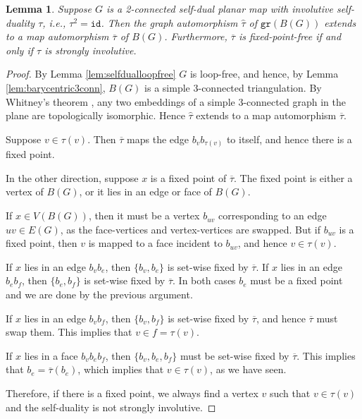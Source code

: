 \documentclass[10pt,a4paper]{article}
\newtheorem{lemma}[theorem]{Lemma}
\newcommand{\gr}{\mathtt{gr}}
\newcommand{\id}{\mathtt{id}}
\begin{document}
\begin{lemma}\label{lem:sisdotherdef}
    Suppose $G$ is a 2-connected self-dual planar map with involutive self-duality $\tau$, i.e., $\tau^2=\id$. Then the graph automorphism $\widehat{\tau}$ of $\gr(B(G))$ extends to a map automorphism $\overline{\tau}$ of $B(G)$. Furthermore, $\overline{\tau}$ is fixed-point-free if and only if $\tau$ is strongly involutive.
\end{lemma}
\begin{proof}
    By Lemma \ref{lem:selfdualloopfree} $G$ is loop-free, and hence, by Lemma \ref{lem:barycentric3conn}, $B(G)$ is a simple  3-connected triangulation. By Whitney's theorem \cite{whitney19332}, any two embeddings of a simple $3$-connected graph in the plane are topologically isomorphic. Hence $\widehat{\tau}$ extends to a map automorphism $\overline{\tau}$.
    
    Suppose $v\in \tau(v)$. Then $\overline{\tau}$ maps the edge $b_vb_{\tau(v)}$ to itself, and hence there is a fixed point. 

    In the other direction, suppose $x$ is a fixed point of $\overline{\tau}$. The fixed point is either a vertex of $B(G)$, or it lies in an edge or face of $B(G)$.
    
    If $x\in V(B(G))$, then it must be a vertex $b_{uv}$ corresponding to an edge $uv\in E(G)$, as the face-vertices and vertex-vertices are swapped. But if $b_{uv}$ is a fixed point, then $v$ is mapped to a face incident to $b_{uv}$, and hence $v\in \tau(v)$.

    If $x$ lies in an edge $b_vb_e$, then $\{b_v,b_e\}$ is set-wise fixed by $\overline{\tau}$. If $x$ lies in an edge $b_eb_f$, then $\{b_e,b_f\}$ is set-wise fixed by $\overline{\tau}$. In both cases $b_e$ must be a fixed point and we are done by the previous argument. 

    If $x$ lies in an edge $b_vb_f$, then $\{b_v,b_f\}$ is set-wise fixed by $\overline{\tau}$, and hence  $\overline{\tau}$ must swap them. This implies that $v\in f=\tau(v).$

    If $x$ lies in a face $b_vb_eb_f$, then $\{b_v,b_e,b_f\}$ must be set-wise fixed by $\overline{\tau}$. This implies that $b_e=\overline{\tau}(b_e)$, which implies that $v\in \tau(v)$, as we have seen. 

    Therefore, if there is a fixed point, we always find a vertex $v$ such that $v\in\tau(v)$ and the self-duality is not strongly involutive.
    
    
    
\end{proof}
\end{document}
